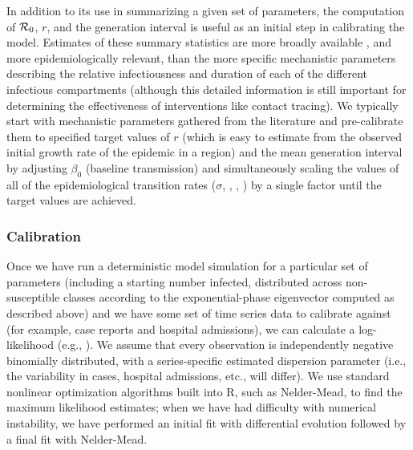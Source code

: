 \documentclass[12pt]{article}\usepackage[]{graphicx}\usepackage[]{color}
\begin{document}
In addition to its use in summarizing a given set of parameters, the computation of ${\mathcal R}_0$, $r$, and the generation interval is useful as an initial step in calibrating the model. 
Estimates of these summary statistics are more broadly available \cite{park2020reconciling}, and more epidemiologically relevant, than the more specific mechanistic parameters describing the relative infectiousness and duration of each of the different infectious compartments (although this detailed information is still important for determining the effectiveness of interventions like contact tracing). 
We typically start with mechanistic parameters gathered from the literature and pre-calibrate them to specified target values of $r$ (which is easy to estimate from the observed initial growth rate of the epidemic in a region) and the mean generation interval by adjusting $\beta_0$ (baseline transmission) and simultaneously scaling the values of all of the epidemiological transition rates ($\sigma$, , , )
by a single factor until the target values are achieved.

\subsubsection*{Calibration}

Once we have run a deterministic model simulation for a particular set of parameters (including a starting number infected, distributed across non-susceptible classes according to the exponential-phase eigenvector computed as described above) and we have some set of time series data to calibrate against (for example, case reports and hospital admissions), we can calculate a log-likelihood (e.g., \cite{Bolk08}). 
We assume that every observation is independently negative binomially distributed, with a series-specific estimated dispersion parameter (i.e., the variability in cases, hospital admissions, etc., will differ). 
We use standard nonlinear optimization algorithms built into R, such as Nelder-Mead, to find the maximum likelihood estimates; when we have had difficulty with numerical instability, we have performed an initial fit with differential evolution \cite{Mull+11} followed by a final fit with Nelder-Mead.
\end{document}
